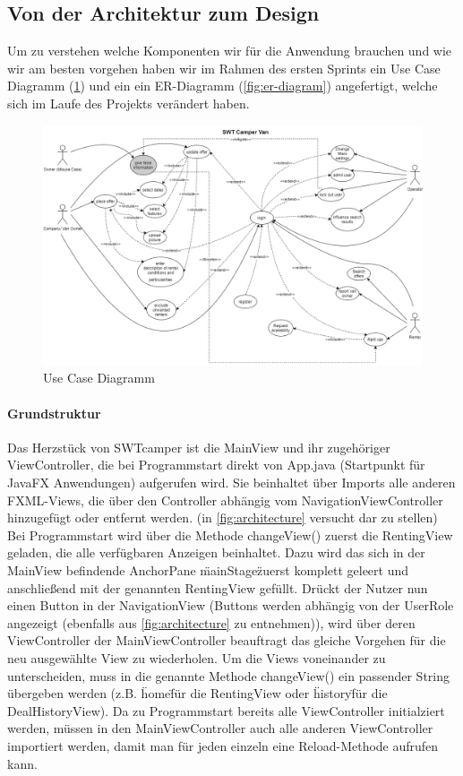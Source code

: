 \subsection{Von der Architektur zum Design}
Um zu verstehen welche Komponenten wir für die Anwendung brauchen und wie wir am besten vorgehen haben wir im Rahmen des ersten Sprints ein Use Case Diagramm (\ref{fig:use-case-diagram}) und ein ein ER-Diagramm (\ref{fig:er-diagram}) angefertigt, welche sich im Laufe des Projekts verändert haben.

\begin{figure}[h]
	\centering
	\includegraphics[width=15cm]{resources/images/use-case-diagram.png}
	\caption{Use Case Diagramm}
	\label{fig:use-case-diagram}
\end{figure}

\paragraph{Grundstruktur}
Das Herzstück von SWTcamper ist die MainView und ihr zugehöriger ViewController, die bei Programmstart direkt von App.java (Startpunkt für JavaFX Anwendungen) aufgerufen wird. Sie beinhaltet über Imports alle anderen FXML-Views, die über den Controller abhängig vom NavigationViewController hinzugefügt oder entfernt werden. (in \ref{fig:architecture} versucht dar zu stellen) Bei Programmstart wird über die Methode changeView() zuerst die RentingView geladen, die alle verfügbaren Anzeigen beinhaltet. Dazu wird das sich in der MainView befindende AnchorPane \"mainStage\" zuerst komplett geleert und anschließend mit der genannten RentingView gefüllt. Drückt der Nutzer nun einen Button in der NavigationView (Buttons werden abhängig von der UserRole angezeigt (ebenfalls aus \ref{fig:architecture} zu entnehmen)), wird über deren ViewController der MainViewController beauftragt das gleiche Vorgehen für die neu ausgewählte View zu wiederholen. Um die Views voneinander zu unterscheiden, muss in die genannte Methode changeView() ein passender String übergeben werden (z.B. \"home\" für die RentingView oder \"history\" für die DealHistoryView). Da zu Programmstart bereits alle ViewController initialziert werden, müssen in den MainViewController auch alle anderen ViewController importiert werden, damit man für jeden einzeln eine Reload-Methode aufrufen kann.

